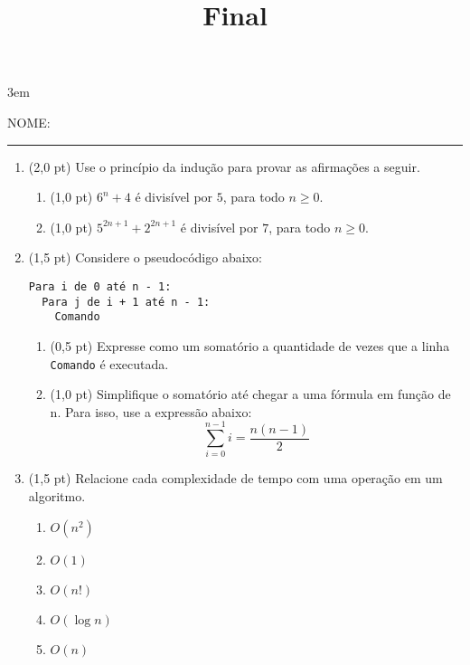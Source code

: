 \documentclass[a4paper,10pt]{article}
\title{Final}
\begin{document}
\maketitle

\emergencystretch 3em



NOME: \rule{.85\textwidth}{0.1mm}

\begin{multicols*}{2}
\setlength{\leftmargini}{0pt}
\begin{enumerate}
  \item (2,0 pt) Use o princípio da indução para provar as afirmações a seguir.

  \begin{enumerate}
    \item (1,0 pt) $ 6^{n} + 4 $ é divisível por $ 5 $, para todo $ n \geq 0 $.
    \item (1,0 pt) $ 5^{2n+1} + 2^{2n+1} $ é divisível por $ 7 $, para todo $ n \geq 0 $.
  \end{enumerate}

  \item (1,5 pt) Considere o pseudocódigo abaixo:

  \begin{verbatim}
Para i de 0 até n - 1:
  Para j de i + 1 até n - 1:
    Comando
  \end{verbatim}

    \begin{enumerate}
      \item (0,5 pt) Expresse como um somatório a quantidade de vezes que a linha \texttt{Comando} é executada.
      \item (1,0 pt) Simplifique o somatório até chegar a uma fórmula em função de n. Para isso, use a expressão abaixo:
      \[
        \sum_{i = 0}^{n - 1} i = \frac{n(n - 1)}{2}
      \]
    \end{enumerate}

  \item (1,5 pt) Relacione cada complexidade de tempo com uma operação em um algoritmo.

  \begin{enumerate}
    \item $ O(n^2) $
    \item $ O(1) $
    \item $ O(n!) $
    \item $ O(\log{n}) $
    \item $ O(n) $
  \end{enumerate}


\end{enumerate}
\end{multicols*}
\end{document}

